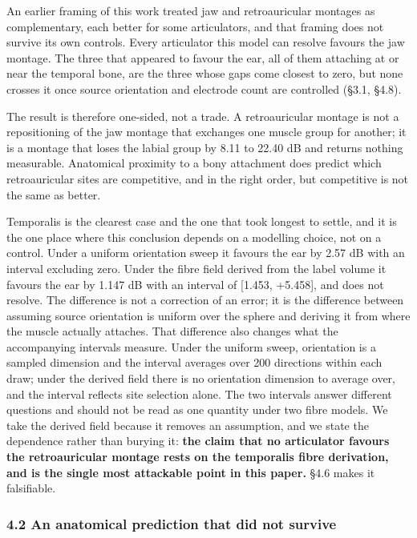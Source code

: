 \documentclass[manuscript,review,anonymous]{acmart}
\newcounter{none}
\begin{document}
An earlier framing of this work treated jaw and retroauricular montages as
complementary, each better for some articulators, and that framing does not
survive its own controls. Every articulator this model can resolve favours the
jaw montage. The three that appeared to favour the ear, all of them attaching at
or near the temporal bone, are the three whose gaps come closest to zero, but
none crosses it once source orientation and electrode count are controlled
(\S{}3.1, \S{}4.8).

The result is therefore one-sided, not a trade. A retroauricular montage
is not a repositioning of the jaw montage that exchanges one muscle group for
another; it is a montage that loses the labial group by 8.11 to 22.40 dB and
returns nothing measurable. Anatomical proximity to a bony attachment does
predict which retroauricular sites are competitive, and in the right order, but
competitive is not the same as better.

Temporalis is the clearest case and the one that took longest to settle, and it
is the one place where this conclusion depends on a modelling choice, not on a
control. Under a uniform orientation sweep it favours the ear by 2.57 dB with an
interval excluding zero. Under the fibre field derived from the label volume it
favours the ear by 1.147 dB with an interval of {[}\textminus{}1.453, +5.458{]}, and does not
resolve. The difference is not a correction of an error; it is the difference
between assuming source orientation is uniform over the sphere and deriving it
from where the muscle actually attaches. That difference also changes what the
accompanying intervals measure. Under the uniform sweep, orientation is a
sampled dimension and the interval averages over 200 directions within each
draw; under the derived field there is no orientation dimension to average over,
and the interval reflects site selection alone. The two intervals answer
different questions and should not be read as one quantity under two fibre
models. We take the derived field because it removes an assumption, and we state
the dependence rather than burying it: \textbf{the claim that no articulator favours
the retroauricular montage rests on the temporalis fibre derivation, and is the
single most attackable point in this paper.} \S{}4.6 makes it falsifiable.

\subsubsection{4.2 An anatomical prediction that did not survive}\label{an-anatomical-prediction-that-did-not-survive}
\end{document}
